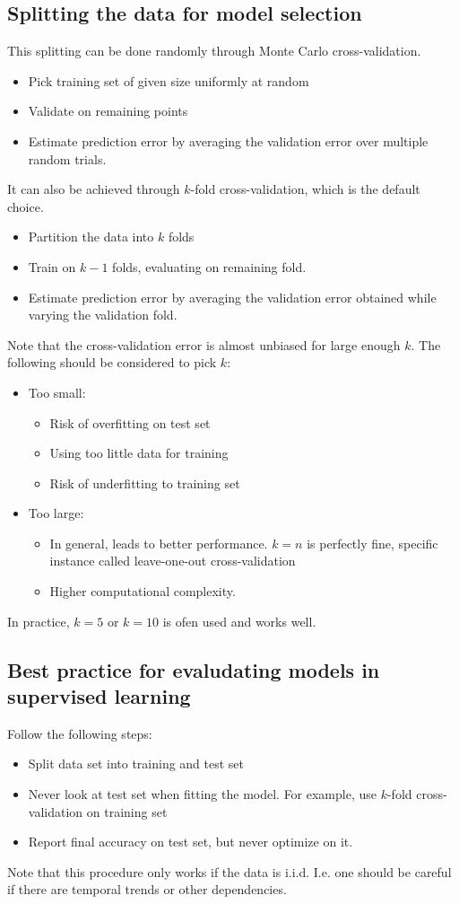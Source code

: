 \documentclass[a4paper,10pt,twoside]{article}
\begin{document}
\subsection{Splitting the data for model selection}
This splitting can be done randomly through Monte Carlo cross-validation.
\begin{itemize}
    \item Pick training set of given size uniformly at random
    \item Validate on remaining points
    \item Estimate prediction error by averaging the validation error over multiple random trials.
\end{itemize}
It can also be achieved through $k$-fold cross-validation, which is the default choice.
\begin{itemize}
    \item Partition the data into $k$ folds
    \item Train on $k-1$ folds, evaluating on remaining fold.
    \item Estimate prediction error by averaging the validation error obtained while varying the validation fold.
\end{itemize}
Note that the cross-validation error is almost unbiased for large enough $k$. The following should be considered to pick $k$:
\begin{itemize}
    \item Too small:
    \begin{itemize}
        \item Risk of overfitting on test set
        \item Using too little data for training
        \item Risk of underfitting to training set
    \end{itemize}
    \item Too large:
    \begin{itemize}
        \item In general, leads to better performance. $k=n$ is perfectly fine, specific instance called leave-one-out cross-validation
        \item Higher computational complexity.
    \end{itemize}
\end{itemize}
In practice, $k=5$ or $k=10$ is ofen used and works well.
\subsection{Best practice for evaludating models in supervised learning}
Follow the following steps:
\begin{itemize}
    \item Split data set into training and test set
    \item Never look at test set when fitting the model. For example, use $k$-fold cross-validation on training set
    \item Report final accuracy on test set, but never optimize on it.
\end{itemize}
Note that this procedure only works if the data is i.i.d. I.e. one should be careful if there are temporal trends or other dependencies.
\end{document}
